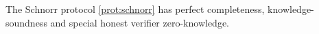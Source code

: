 \begin{thm}
The Schnorr protocol \ref{prot:schnorr} has perfect completeness, knowledge-soundness and special honest verifier zero-knowledge.
\end{thm}
%
%
%
%
